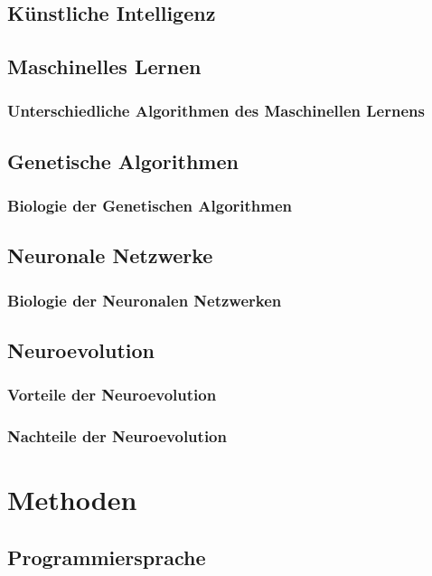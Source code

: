 \documentclass[11pt,DIV=10,final]{scrreprt} %
\begin{document}
\section{Künstliche Intelligenz}
\section{Maschinelles Lernen}
\subsection{Unterschiedliche Algorithmen des Maschinellen Lernens}
\section{Genetische Algorithmen}
\subsection{Biologie der Genetischen Algorithmen}
\section{Neuronale Netzwerke}
\subsection{Biologie der Neuronalen Netzwerken}
\section{Neuroevolution}
\subsection{Vorteile der Neuroevolution}
\subsection{Nachteile der Neuroevolution}
\chapter{Methoden}
\section{Programmiersprache}
\end{document}
